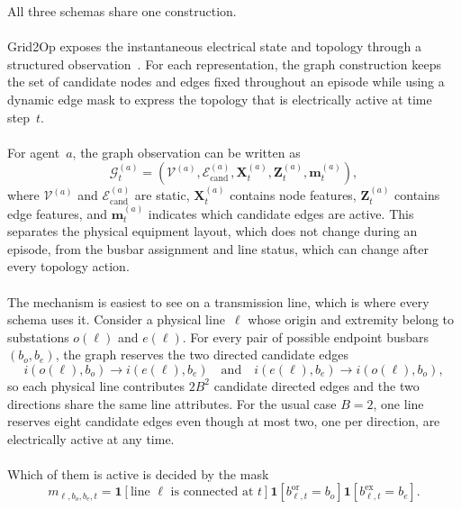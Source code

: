 All three schemas share one construction.
\\
\\
Grid2Op exposes the instantaneous electrical state and topology through a
structured observation~\cite{donnot2020grid2op}. For each representation,
the graph construction keeps the set of candidate nodes and edges fixed
throughout an episode while using a dynamic edge mask to express the topology
that is electrically active at time step~$t$.
\\
\\
For agent~$a$, the graph observation can be written as
\begin{equation}
  \mathcal{G}^{(a)}_t =
  \left(\mathcal{V}^{(a)},\mathcal{E}^{(a)}_{\mathrm{cand}},
  \mathbf{X}^{(a)}_t,\mathbf{Z}^{(a)}_t,\mathbf{m}^{(a)}_t\right),
  \label{eq:agent-graph-observation}
\end{equation}
where $\mathcal{V}^{(a)}$ and
$\mathcal{E}^{(a)}_{\mathrm{cand}}$ are static, $\mathbf{X}^{(a)}_t$ contains
node features, $\mathbf{Z}^{(a)}_t$ contains edge features, and
$\mathbf{m}^{(a)}_t$ indicates which candidate edges are active. This separates
the physical equipment layout, which does not change during an episode, from
the busbar assignment and line status, which can change after every topology
action.
\\
\\
The mechanism is easiest to see on a transmission line, which is where every
schema uses it. Consider a physical line~$\ell$ whose origin and extremity
belong to substations $o(\ell)$ and $e(\ell)$. For every pair of possible
endpoint busbars $(b_o,b_e)$, the graph reserves the two directed candidate
edges
\begin{equation}
  i(o(\ell),b_o)\rightarrow i(e(\ell),b_e)
  \quad\text{and}\quad
  i(e(\ell),b_e)\rightarrow i(o(\ell),b_o),
  \label{eq:candidate-line-edges}
\end{equation}
so each physical line contributes $2B^2$ candidate directed edges and the two
directions share the same line attributes. For the usual case $B=2$, one line
reserves eight candidate edges even though at most two, one per direction, are
electrically active at any time.
\\
\\
Which of them is active is decided by the mask
\begin{equation}
  m_{\ell,b_o,b_e,t}=
  \mathbf{1}\!\left[\text{line }\ell\text{ is connected at }t\right]
  \mathbf{1}\!\left[b^{\mathrm{or}}_{\ell,t}=b_o\right]
  \mathbf{1}\!\left[b^{\mathrm{ex}}_{\ell,t}=b_e\right].
  \label{eq:physical-edge-mask}
\end{equation}
